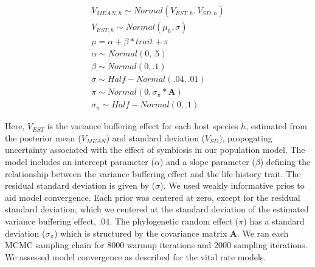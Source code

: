 \documentclass[12pt]{article}
\begin{document}
\begin{subequations}
	\begin{align}
		V_{MEAN,h} \sim Normal(V_{EST,h}, V_{SD,h})\\
		V_{EST,h} \sim Normal(\mu_h,\sigma)\\
		\mu = \alpha + \beta*trait + \pi \\
		\alpha \sim Normal(0,.5)\\
		\beta \sim Normal(0,.1)\\
		\sigma \sim Half-Normal(.04,.01)\\
		\pi \sim Normal(0,\sigma_{\pi}*\mathbf{A})\\
		\sigma_{\pi} \sim Half-Normal(0,.1)
	\end{align}
\end{subequations}

Here, $V_{EST}$ is the variance buffering effect for each host species $h$, estimated from the posterior mean ($V_{MEAN}$) and standard deviation ($V_{SD}$), propogating uncertainty associated with the effect of symbiosis in our population model.
The model includes an intercept parameter ($\alpha$) and a slope parameter ($\beta$) defining the relationship between the variance buffering effect and the life history trait. 
The residual standard deviation is given by ($\sigma$). 
We used weakly informative prios to aid model convergence.
Each prior was centered at zero, except for the residual standard deviation, which we centered at the standard deviation of the estimated variance buffering effect, $.04$.
The phylogenetic random effect ($\pi$) has a standard deviation ($\sigma_{\pi}$) which is structured by the covariance matrix \textbf{A}.
We ran each MCMC sampling chain for 8000 warmup iterations and 2000 sampling iterations. 
We assessed model convergence as described for the vital rate models.
\end{document}
